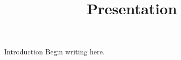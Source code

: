 \documentclass{beamer}
\title{Presentation}
\author{}
\date{}
\begin{document}
\begin{frame}
  \titlepage
\end{frame}
\begin{frame}{Introduction}
  Begin writing here.
\end{frame}
\end{document}
